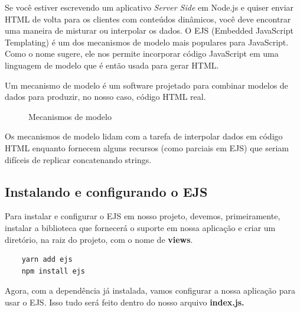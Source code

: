 Se você estiver escrevendo um aplicativo \textit{Server Side} em Node.js e quiser enviar HTML de volta para os clientes com conteúdos dinâmicos, você deve encontrar uma maneira de misturar ou interpolar os dados. O EJS (Embedded JavaScript Templating) é um dos mecanismos de modelo mais populares para JavaScript. Como o nome sugere, ele nos permite incorporar código JavaScript em uma linguagem de modelo que é então usada para gerar HTML.

Um mecanismo de modelo é um software projetado para combinar modelos de dados para produzir, no nosso caso, código HTML real.

\begin{figure}[H]
	\centering
	\caption{Mecanismos de modelo}
\end{figure}

Os mecanismos de modelo lidam com a tarefa de interpolar dados em código HTML enquanto fornecem alguns recursos (como parciais em EJS) que seriam difíceis de replicar concatenando strings.

\subsection{Instalando e configurando o EJS}

Para instalar e configurar o EJS em nosso projeto, devemos, primeiramente, instalar a biblioteca que fornecerá o suporte em nossa aplicação e criar um diretório, na raiz do projeto, com o nome de \textbf{views}.

\begin{verbatim}
	yarn add ejs
	npm install ejs
\end{verbatim}

Agora, com a dependência já instalada, vamos configurar a nossa aplicação para usar o EJS. Isso tudo será feito dentro do nosso arquivo \textbf{index.js.}

